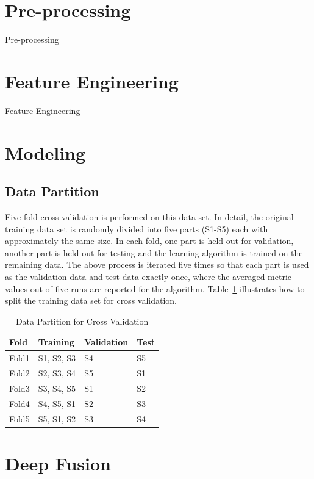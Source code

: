 \documentclass[12pt]{article}
\begin{document}
\section{Pre-processing}


Pre-processing

\section{Feature Engineering}

Feature Engineering  

\section{Modeling}

\subsection{Data Partition}

Five-fold cross-validation is performed on this data set. In detail, the original training data set is randomly divided into five parts (S1-S5) each with approximately the same size. In each fold, one part is held-out for validation, another part is held-out for testing and the learning algorithm is trained on the remaining data. The above process is iterated five times so that each part is used as the validation data and test data exactly once, where the averaged metric values out of five runs are reported for the algorithm. Table~{\ref{tab:data-part-cv}} illustrates how to split the training data set for cross validation.

\begin{table}[ht]
\centering
\caption{Data Partition for Cross Validation}
    \label{tab:data-part-cv}
\begin{tabular}{p{3cm}p{3cm}p{3cm}p{3cm}}
\hline
 Fold & Training	& Validation        & Test \\
\hline\hline
Fold1 & S1, S2, S3 & S4 & S5 \\ \hline
Fold2	&	S2, S3, S4	&	S5	&		S1 \\ \hline	
Fold3	&	S3, S4, S5	&	S1	&		S2	\\ \hline
Fold4	&	S4, S5, S1	&	S2	&		S3	\\ \hline
Fold5	&	S5, S1, S2	&	S3	&		S4 \\ \hline
\end{tabular}
\end{table}

\section{Deep Fusion}
\end{document}
